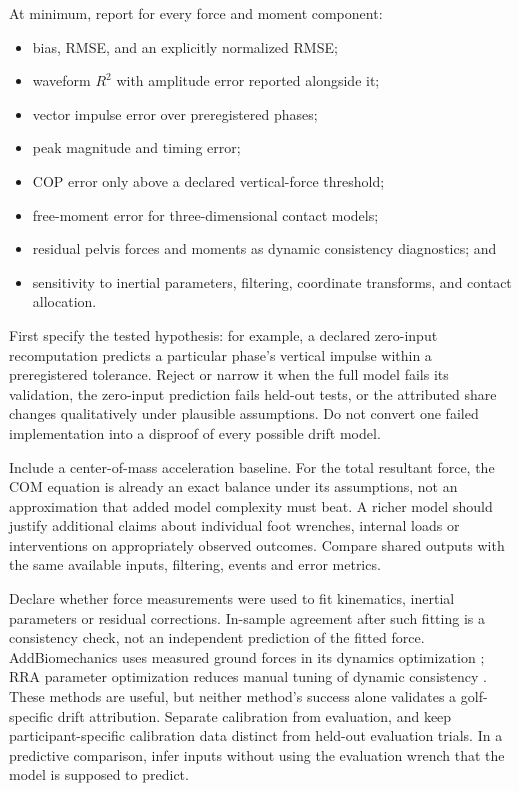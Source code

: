 At minimum, report for every force and moment component:

\begin{itemize}
\item
  bias, RMSE, and an explicitly normalized RMSE;
\item
  waveform \(R^2\) with amplitude error reported alongside it;
\item
  vector impulse error over preregistered phases;
\item
  peak magnitude and timing error;
\item
  COP error only above a declared vertical-force threshold;
\item
  free-moment error for three-dimensional contact models;
\item
  residual pelvis forces and moments as dynamic consistency diagnostics; and
\item
  sensitivity to inertial parameters, filtering, coordinate transforms, and contact allocation.
\end{itemize}

First specify the tested hypothesis: for example, a declared zero-input recomputation predicts a particular phase's vertical impulse within a preregistered tolerance. Reject or narrow it when the full model fails its validation, the zero-input prediction fails held-out tests, or the attributed share changes qualitatively under plausible assumptions. Do not convert one failed implementation into a disproof of every possible drift model.

Include a center-of-mass acceleration baseline. For the total resultant force, the COM equation is already an exact balance under its assumptions, not an approximation that added model complexity must beat. A richer model should justify additional claims about individual foot wrenches, internal loads or interventions on appropriately observed outcomes. Compare shared outputs with the same available inputs, filtering, events and error metrics.

Declare whether force measurements were used to fit kinematics, inertial parameters or residual corrections. In-sample agreement after such fitting is a consistency check, not an independent prediction of the fitted force. AddBiomechanics uses measured ground forces in its dynamics optimization \citep{werling2023}; RRA parameter optimization reduces manual tuning of dynamic consistency \citep{sturdy2022}. These methods are useful, but neither method's success alone validates a golf-specific drift attribution. Separate calibration from evaluation, and keep participant-specific calibration data distinct from held-out evaluation trials. In a predictive comparison, infer inputs without using the evaluation wrench that the model is supposed to predict.


